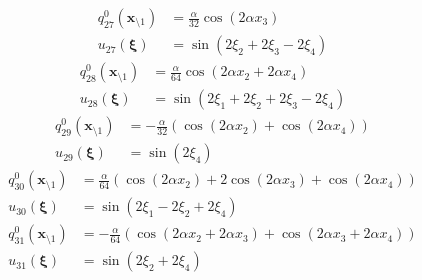 \documentclass[11pt]{jfm}
\numberwithin{equation}{section}
\begin{document}
\vspace{-0.4cm}
\begin{subequations}
\label{A30}
\begin{align}
q_{27}^0(\boldsymbol{x}_{\setminus 1})&=\frac{\alpha}{32}   \cos (2 \alpha  x_3)
\label{A30a} \\
u_{27}(\boldsymbol{\xi})&=\sin (2 \xi_2+2 \xi_3-2 \xi_4)
\label{A30b}
\end{align}\end{subequations}
\vspace{-0.4cm}
\begin{subequations}
\label{A31}
\begin{align}
q_{28}^0(\boldsymbol{x}_{\setminus 1})&=\frac{\alpha}{64}   \cos (2 \alpha  x_2+2 \alpha  x_4)
\label{A31a} \\
u_{28}(\boldsymbol{\xi})&=\sin (2 \xi_1+2 \xi_2+2 \xi_3-2 \xi_4)
\label{A31b}
\end{align}\end{subequations}
\vspace{-0.4cm}
\begin{subequations}
\label{A32}
\begin{align}
q_{29}^0(\boldsymbol{x}_{\setminus 1})&=-\frac{\alpha}{32} (\cos (2 \alpha  x_2)+\cos (2 \alpha  x_4))
\label{A32a} \\
u_{29}(\boldsymbol{\xi})&=\sin (2 \xi_4)
\label{A32b}
\end{align}\end{subequations}
\vspace{-0.4cm}
\begin{subequations}
\label{A33}
\begin{align}
q_{30}^0(\boldsymbol{x}_{\setminus 1})&=\frac{\alpha}{64}   (\cos (2 \alpha  x_2)+2 \cos (2 \alpha  x_3)+\cos (2 \alpha  x_4))
\label{A33a} \\
u_{30}(\boldsymbol{\xi})&=\sin (2 \xi_1-2 \xi_2+2 \xi_4)
\label{A33b}
\end{align}\end{subequations}
\vspace{-0.4cm}
\begin{subequations}
\label{A34}
\begin{align}
q_{31}^0(\boldsymbol{x}_{\setminus 1})&=-\frac{\alpha}{64}   (\cos (2 \alpha  x_2+2 \alpha  x_3)+\cos (2 \alpha  x_3+2 \alpha  x_4))
\label{A34a} \\
u_{31}(\boldsymbol{\xi})&=\sin (2 \xi_2+2 \xi_4)
\label{A34b}
\end{align}\end{subequations}
\end{document}
